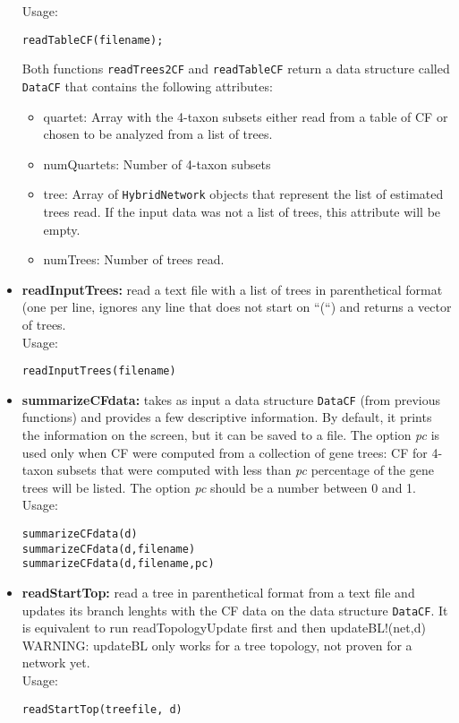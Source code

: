 \documentclass[12pt]{article}
\begin{document}
\begin{itemize}
Usage:
\begin{lstlisting}
readTableCF(filename);
\end{lstlisting}

Both functions \texttt{readTrees2CF} and \texttt{readTableCF} return a
data structure called \texttt{DataCF} that contains the following
attributes:
\begin{itemize}
\item{quartet: Array with the 4-taxon subsets either read from a table of CF
    or chosen to be analyzed from a list of trees.}
\item{numQuartets: Number of 4-taxon subsets}
\item{tree: Array of \texttt{HybridNetwork} objects that represent the
  list of estimated trees read. If the input data was not a list of
  trees, this attribute will be empty.}
\item{numTrees: Number of trees read.}
\end{itemize}


\item \textbf{readInputTrees:} read a text file with a list of trees
  in parenthetical format (one per line, ignores any line that does
  not start on ``(``) and
  returns a vector of trees.\\
  Usage:
\begin{lstlisting}
readInputTrees(filename)
\end{lstlisting}

\item \textbf{summarizeCFdata:} takes as input a data structure \texttt{DataCF} (from
  previous functions) and provides a few descriptive information. By
  default, it prints the information on the screen, but it can be
  saved to a file. The option \textit{pc} is used only when CF were
  computed from a collection of gene trees: CF for 4-taxon subsets
  that were computed with less than \textit{pc} percentage of the gene
  trees will be listed. The option \textit{pc} should be a number
  between 0 and 1.\\
Usage:
\begin{lstlisting}
summarizeCFdata(d)
summarizeCFdata(d,filename)
summarizeCFdata(d,filename,pc)
\end{lstlisting}

\item \textbf{readStartTop:} read a tree in parenthetical format from
  a text file and updates its branch lenghts with the CF data on
  the data structure \texttt{DataCF}. It is equivalent to run
  readTopologyUpdate first and then updateBL!(net,d)\\
  WARNING: updateBL only works for a tree topology, not proven for a
  network yet.\\  Usage:
\begin{lstlisting}
readStartTop(treefile, d)
\end{lstlisting}

\end{itemize}
\end{document}
